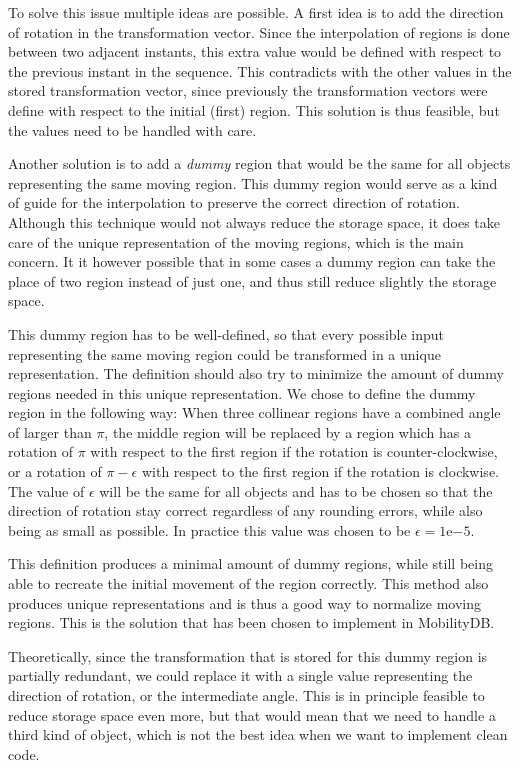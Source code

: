 To solve this issue multiple ideas are possible. A first idea is to add the direction of rotation in the transformation vector. Since the interpolation of regions is done between two adjacent instants, this extra value would be defined with respect to the previous instant in the sequence. This contradicts with the other values in the stored transformation vector, since previously the transformation vectors were define with respect to the initial (first) region. This solution is thus feasible, but the values need to be handled with care.

Another solution is to add a \textit{dummy} region that would be the same for all objects representing the same moving region. This dummy region would serve as a kind of guide for the interpolation to preserve the correct direction of rotation. Although this technique would not always reduce the storage space, it does take care of the unique representation of the moving regions, which is the main concern. It it however possible that in some cases a dummy region can take the place of two region instead of just one, and thus still reduce slightly the storage space.

This dummy region has to be well-defined, so that every possible input representing the same moving region could be transformed in a unique representation. The definition should also try to minimize the amount of dummy regions needed in this unique representation. We chose to define the dummy region in the following way: When three collinear regions have a combined angle of larger than $\pi$, the middle region will be replaced by a region which has a rotation of $\pi$ with respect to the first region if the rotation is counter-clockwise, or a rotation of $\pi - \epsilon$ with respect to the first region if the rotation is clockwise. The value of $\epsilon$ will be the same for all objects and has to be chosen so that the direction of rotation stay correct regardless of any rounding errors, while also being as small as possible. In practice this value was chosen to be $\epsilon = 1\mathrm{e}{-5}$.

This definition produces a minimal amount of dummy regions, while still being able to recreate the initial movement of the region correctly. This method also produces unique representations and is thus a good way to normalize moving regions. This is the solution that has been chosen to implement in MobilityDB.

Theoretically, since the transformation that is stored for this dummy region is partially redundant, we could replace it with a single value representing the direction of rotation, or the intermediate angle. This is in principle feasible to reduce storage space even more, but that would mean that we need to handle a third kind of object, which is not the best idea when we want to implement clean code. 

